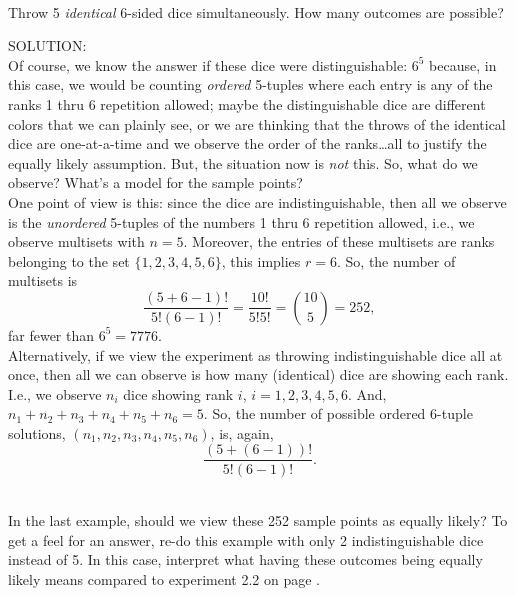 \documentclass[12pt]{article}
\begin{document}
\bigskip

\\
Throw 5 {\em identical} 6-sided dice simultaneously.  How many outcomes are possible?\medskip

\noindent SOLUTION:\\
Of course, we know the answer if these dice were distinguishable: $6^5$
because, in this case, we would be counting {\em ordered} 5-tuples where each entry is any of the ranks 1 thru 6 repetition allowed;
maybe the distinguishable dice are different colors that we can plainly see, or we are thinking that the throws
of the identical dice are one-at-a-time and we observe the order of the ranks\dots all to justify the equally likely assumption.
But, the situation now is {\em not} this.
So, what do we observe?  What's a model for the sample points?\\

\noindent One point of view is this: since the dice are indistinguishable, then all we observe is the {\em unordered} 5-tuples of the numbers 1 thru 6 repetition allowed,
i.e., we observe multisets with $n=5$. Moreover, the entries of these multisets are ranks belonging to the set $\{1,2,3,4,5,6\}$, this implies $r=6$.
So, the number of multisets is
$$\dfrac {(5+6-1)!}{5!(6-1)!}=\dfrac {10!}{5!5!} = \displaystyle {10\choose 5} = 252,$$
far fewer than $6^5=7776$.\\

\noindent Alternatively, if we view the experiment as throwing indistinguishable dice all at once, then all we can observe is how many (identical) dice
are showing each rank. I.e., we observe $n_i$ dice showing rank $i$, $i=1,2,3,4,5,6$. And, $n_1+n_2+n_3+n_4+n_5+n_6=5$.
So, the number of possible ordered 6-tuple solutions,
$(n_1,n_2,n_3,n_4,n_5,n_6)$,
is, again,
$$\dfrac {(5+(6-1))!}{5!(6-1)!}.$$






\newpage




\\
\noindent In the last example, should we view these 252 sample points as equally likely?
To get a feel for an answer, re-do this example with only 2 indistinguishable dice instead of 5.
In this case, interpret what having these outcomes being equally likely means compared to experiment 2.2 on page \pageref{2dicesamplespace}.\\
\end{document}
